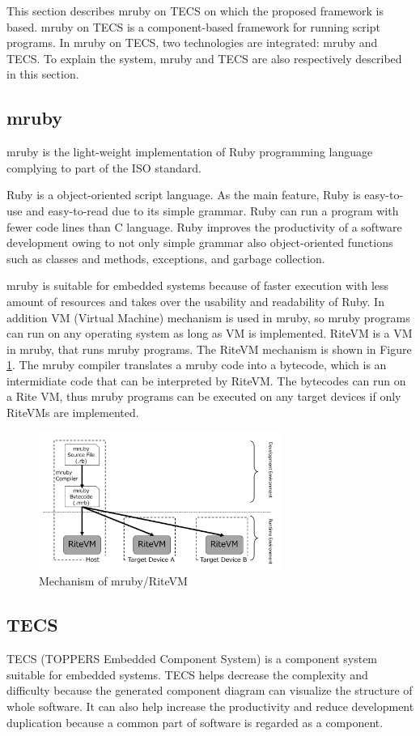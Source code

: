 \documentclass[conference,compsoc]{IEEEtran}
\begin{document}
This section describes mruby on TECS on which the proposed framework is based.
mruby on TECS is a component-based framework for running script programs.
In mruby on TECS, two technologies are integrated: mruby and TECS.
To explain the system, mruby and TECS are also respectively described in this section.

\subsection{mruby}
\label{sec:mruby}
mruby is the light-weight implementation of Ruby programming language complying to part of the ISO standard.

Ruby is a object-oriented script language.
As the main feature, Ruby is easy-to-use and easy-to-read due to its simple grammar.
Ruby can run a program with fewer code lines than C language.
Ruby improves the productivity of a software development owing to not only simple grammar also object-oriented functions such as classes and methods, exceptions, and garbage collection.

mruby is suitable for embedded systems because of faster execution with less amount of resources and takes over the usability and readability of Ruby.
In addition VM (Virtual Machine) mechanism is used in mruby, so mruby programs can run on any operating system as long as VM is implemented.
RiteVM is a VM in mruby, that runs mruby programs.
The RiteVM mechanism is shown in Figure \ref{fig:mruby}.
The mruby compiler translates a mruby code into a bytecode, which is an intermidiate code that can be interpreted by RiteVM.
The bytecodes can run on a Rite VM, thus mruby programs can be executed on any target devices if only RiteVMs are implemented.
\begin{figure}[t]
    \centering
    \includegraphics[width=8cm,clip]{figure/mruby.pdf}
    \caption{Mechanism of mruby/RiteVM}
    \label{fig:mruby}
\end{figure}

\subsection{TECS}
\label{sec:TECS}
TECS (TOPPERS Embedded Component System) is a component system suitable for embedded systems.
TECS helps decrease the complexity and difficulty because the generated component diagram can visualize the structure of whole software.
It can also help increase the productivity and reduce development duplication  because a common part of software is regarded as a component.
\end{document}
